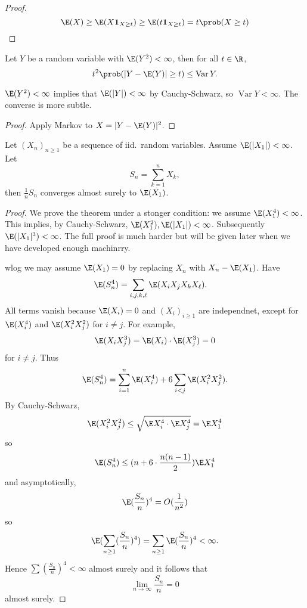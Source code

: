 \documentclass[a4paper]{article}
\renewcommand{\P}{\prob} %
\DeclareMathOperator{\var}{Var} %
\begin{document}
\begin{proof}
  \[
    \E(X)
    \geq \E(X \mathbf 1_{X \geq t})
    \geq \E(t \mathbf 1_{X \geq t})
    = t \P(X \geq t)
  \]
\end{proof}

\begin{proposition}[Chebyshev]
  Let \(Y\) be a random variable with \(\E(Y^2) < \infty\), then for all \(t \in \R\),
  \[
    t^2 \P(|Y - \E(Y)| \geq t) \leq \var Y.
  \]
\end{proposition}

\(\E(Y^2) < \infty\) implies that \(\E(|Y|) < \infty\) by Cauchy-Schwarz, so \(\var Y < \infty\). The converse is more subtle.

\begin{proof}
  Apply Markov to \(X = |Y - \E(Y)|^2\).
\end{proof}

\begin{theorem}
  Let \((X_n)_{n \geq 1}\) be a sequence of iid.\ random variables. Assume \(\E(|X_1|) < \infty\). Let
  \[
    S_n = \sum_{k = 1}^n X_k,
  \]
  then \(\frac{1}{n} S_n\) converges almost surely to \(\E(X_1)\).
\end{theorem}

\begin{proof}
  We prove the theorem under a stonger condition: we assume \(\E(X_1^4) < \infty\). This implies, by Cauchy-Schwarz, \(\E(X_1^2), \E(|X_1|) < \infty\). Subsequently \(\E(|X_1|^3) < \infty\). The full proof is much harder but will be given later when we have developed enough machinrry.

  wlog we may assume \(\E(X_1) = 0\) by replacing \(X_n\) with \(X_n - \E(X_1)\). Have
  \begin{align*}
    \E(S_n^4)
    &= \sum_{i,j, k, \ell} \E(X_iX_jX_kX_\ell).
  \end{align*}
  All terms vanish because \(\E(X_i) = 0\) and \((X_i)_{i \geq 1}\) are independnet, except for \(\E(X_i^4)\) and \(\E(X_i^2X_j^2)\) for \(i \neq j\). For example,
  \[
    \E(X_iX_j^3) = \E(X_i) \cdot \E(X_j^3) = 0
  \]
  for \(i \neq j\). Thus
  \[
    \E(S_n^4) = \sum_{i = 1}^n \E (X_i^4) + 6 \sum_{i < j} \E(X_i^2 X_j^2).
  \]
  By Cauchy-Schwarz,
  \[
    \E(X_i^2X_j^2) \leq \sqrt{\E X_i^4 \cdot \E X_j^4} = \E X_1^4
  \]
  so
  \[
    \E(S_n^4) \leq (n + 6 \cdot \frac{n(n - 1)}{2}) \E X_1^4
  \]
  and asymptotically,
  \[
    \E (\frac{S_n}{n})^4 = O(\frac{1}{n^2})
  \]
  so
  \[
    \E (\sum_{n \geq 1} (\frac{S_n}{n})^4) = \sum_{n \geq 1} \E(\frac{S_n}{n})^4 < \infty.
  \]
  Hence \(\sum (\frac{S_n}{n})^4 < \infty\) almost surely and it follows that
  \[
    \lim_{n \to \infty} \frac{S_n}{n} = 0
  \]
  almost surely.
\end{proof}
\end{document}
